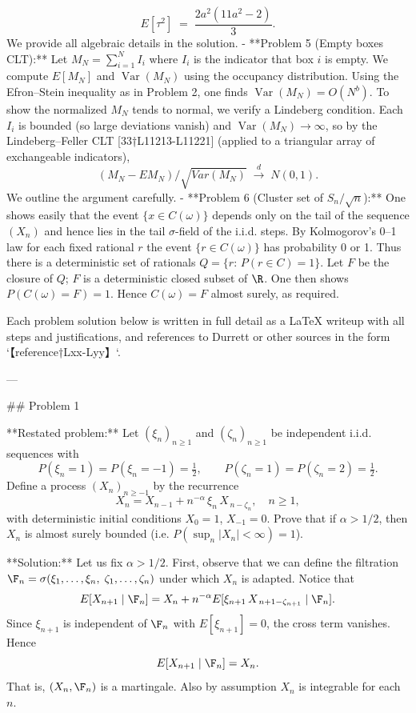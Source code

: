 \documentclass[11pt]{article}
\DeclareMathOperator{\Var}{Var}
\begin{document}
$$E[\tau^2] \;=\; \frac{2a^2(11a^2-2)}{3}.$$
We provide all algebraic details in the solution.
- **Problem 5 (Empty boxes CLT):** Let $M_N=\sum_{i=1}^N I_i$ where $I_i$ is the indicator that box $i$ is empty. We compute $E[M_N]$ and $\Var(M_N)$ using the occupancy distribution. Using the Efron–Stein inequality as in Problem 2, one finds $\Var(M_N)=O(N^b)$. To show the normalized $M_N$ tends to normal, we verify a Lindeberg condition. Each $I_i$ is bounded (so large deviations vanish) and $\Var(M_N)\to\infty$, so by the Lindeberg–Feller CLT [33†L11213-L11221] (applied to a triangular array of exchangeable indicators),
$$(M_N - EM_N)/\sqrt{Var(M_N)} \;\xrightarrow{d}\; N(0,1).$$
We outline the argument carefully.
- **Problem 6 (Cluster set of $S_n/\sqrt{n}$):** One shows easily that the event $\{x\in C(\omega)\}$ depends only on the tail of the sequence $(X_n)$ and hence lies in the tail $\sigma$-field of the i.i.d. steps. By Kolmogorov’s 0–1 law for each fixed rational $r$ the event $\{r\in C(\omega)\}$ has probability 0 or 1. Thus there is a deterministic set of rationals $Q=\{r:\,P(r\in C)=1\}$. Let $F$ be the closure of $Q$; $F$ is a deterministic closed subset of $\R$. One then shows $P(C(\omega)=F)=1$. Hence $C(\omega)=F$ almost surely, as required.

Each problem solution below is written in full detail as a LaTeX writeup with all steps and justifications, and references to Durrett or other sources in the form `【reference†Lxx-Lyy】`.

---

\#\# Problem 1

**Restated problem:** Let $(\xi_n)_{n\ge1}$ and $(\zeta_n)_{n\ge1}$ be independent i.i.d. sequences with
\[
P(\xi_n=1)=P(\xi_n=-1)=\tfrac12,\qquad
P(\zeta_n=1)=P(\zeta_n=2)=\tfrac12.
\]
Define a process $(X_n)_{n\ge-1}$ by the recurrence
\[
X_n = X_{n-1} + n^{-\alpha}\,\xi_n\,X_{\,n-\zeta_n},\quad n\ge1,
\]
with deterministic initial conditions $X_0=1$, $X_{-1}=0$. Prove that if $\alpha>1/2$, then $X_n$ is almost surely bounded (i.e. $P(\sup_n |X_n|<\infty)=1$).

**Solution:** Let us fix $\alpha>1/2$. First, observe that we can define the filtration $\F_n = \sigma(\xi_1,\ldots,\xi_n,\;\zeta_1,\ldots,\zeta_n)$ under which $X_n$ is adapted. Notice that
\[
E[X_{n+1}\mid \F_n]
= X_n + n^{-\alpha}E[\xi_{n+1}\,X_{\,n+1-\zeta_{n+1}}\mid\F_n].
\]
Since $\xi_{n+1}$ is independent of $\F_n$ with $E[\xi_{n+1}]=0$, the cross term vanishes. Hence
\[
E[X_{n+1}\mid\F_n] = X_n.
\]
That is, $(X_n,\F_n)$ is a martingale. Also by assumption $X_n$ is integrable for each $n$.
\end{document}
